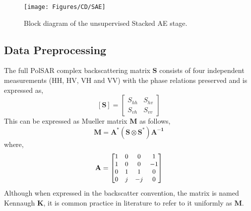 \begin{figure}[tbhp]
\centering
\texttt{[image: Figures/CD/SAE]}
\caption{Block diagram of the unsupervised Stacked AE stage.}
\label{fig:SAE}
\end{figure}

\subsection{Data Preprocessing}
\label{sub:pre}
The full PolSAR complex backscattering matrix $\mathbf{S}$ consists of four independent measurements (HH, HV, VH and VV) with the phase relations preserved and is expressed as,
\begin{equation}
\mathbf{[S]} =
  \begin{bmatrix}
    S_{hh} & S_{hv}  \\
    S_{vh} & S_{vv}
  \end{bmatrix}
 \label{eqn:scattring}
\end{equation}
This can be expressed as Mueller matrix $\mathbf{M}$ as follows, 
\begin{equation}
\mathbf{M} = \mathbf{A}^* \left( \mathbf{S} \otimes \mathbf{S^{*}} \right) \mathbf{A^{-1}} 
\end{equation}
where,
\begin{equation} \small
\mathbf{A} = \begin{bmatrix}
    1 & 0 &  0 & 1 \\
    1 & 0 & 0&  -1\\ 
    0 & 1 &  1  &  0 \\
    0 & j  & -j & 0 \\
\end{bmatrix}
\end{equation}
Although when expressed in the backscatter convention, the matrix is named Kennaugh $\mathbf{K}$, it is common practice in literature to refer to it uniformly as $\mathbf{M}$. 

